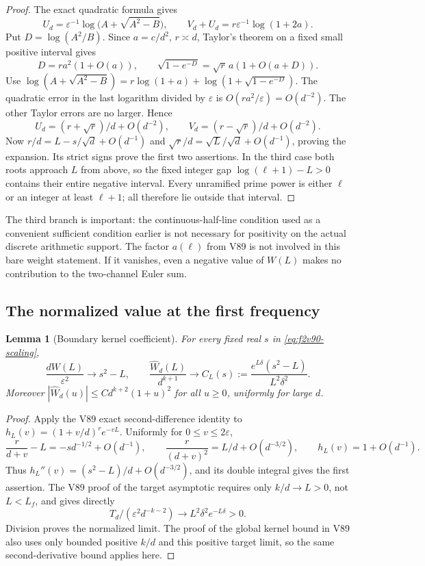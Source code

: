 \documentclass[11pt]{article}
\newtheorem{lemma}[theorem]{Lemma}
\theoremstyle{definition}
\theoremstyle{remark}
\begin{document}
\begin{proof}
The exact quadratic formula gives
\[
 U_d=\varepsilon^{-1}\log\bigl(A+\sqrt{A^2-B}\bigr),\qquad
 V_d+U_d=r\varepsilon^{-1}\log(1+2a).
\]
Put \(D=\log(A^2/B)\).  Since \(a=c/d^2\), \(r\asymp d\),
Taylor's theorem on a fixed small positive interval gives
\[
 D=r a^2(1+O(a)),\qquad
 \sqrt{1-e^{-D}}=\sqrt r\,a(1+O(a+D)).
\]
Use
\(\log(A+\sqrt{A^2-B})=r\log(1+a)
  +\log(1+\sqrt{1-e^{-D}})\).
The quadratic error in the last logarithm divided by
\(\varepsilon\) is \(O(r a^2/\varepsilon)=O(d^{-2})\).
The other Taylor errors are no larger.  Hence
\[
 U_d=(r+\sqrt r)/d+O(d^{-2}),\qquad
 V_d=(r-\sqrt r)/d+O(d^{-2}).
\]
Now \(r/d=L-s/\sqrt d+O(d^{-1})\) and
\(\sqrt r/d=\sqrt L/\sqrt d+O(d^{-1})\), proving the expansion.
Its strict signs prove the first two assertions.  In the third case
both roots approach \(L\) from above, so the fixed integer gap
\(\log(\ell+1)-L>0\) contains their entire negative interval.
Every unramified prime power is either \(\ell\) or an integer at
least \(\ell+1\); all therefore lie outside that interval.
\end{proof}

The third branch is important: the continuous-half-line condition used
as a convenient sufficient condition earlier is not necessary for
positivity on the actual discrete arithmetic support.  The factor
\(a(\ell)\) from V89 is not involved in this bare weight statement.
If it vanishes, even a negative value of \(W(L)\) makes no contribution
to the two-channel Euler sum.

\subsection{The normalized value at the first frequency}

\begin{lemma}[Boundary kernel coefficient]
\label{lem:f2v90-kernel}
For every fixed real \(s\) in \eqref{eq:f2v90-scaling},
\begin{equation}
 \frac{dW(L)}{\varepsilon^2}\longrightarrow s^2-L,
 \qquad
 \frac{\widehat W_d(L)}{d^{k+1}}
 \longrightarrow
 C_L(s):=\frac{e^{L\delta}(s^2-L)}{L^2\delta^2}.
 \label{eq:f2v90-kernel}
\end{equation}
Moreover \(|\widehat W_d(u)|\le C d^{k+2}(1+u)^2\) for all
\(u\ge0\), uniformly for large \(d\).
\end{lemma}

\begin{proof}
Apply the V89 exact second-difference identity to
\(h_L(v)=(1+v/d)^r e^{-vL}\).  Uniformly for
\(0\le v\le2\varepsilon\),
\[
 \frac r{d+v}-L=-s d^{-1/2}+O(d^{-1}),\qquad
 \frac r{(d+v)^2}=L/d+O(d^{-3/2}),\qquad h_L(v)=1+O(d^{-1}).
\]
Thus
\(h_L''(v)=(s^2-L)/d+O(d^{-3/2})\), and its double integral
gives the first assertion.  The V89 proof of the target asymptotic
requires only \(k/d\to L>0\), not \(L<L_f\), and gives directly
\[
 T_d/(\varepsilon^2d^{-k-2})\longrightarrow
 L^2\delta^2e^{-L\delta}>0.
\]
Division proves the normalized limit.  The proof of the global kernel
bound in V89 also uses only bounded positive \(k/d\) and this positive
target limit, so the same second-derivative bound applies here.
\end{proof}
\end{document}
